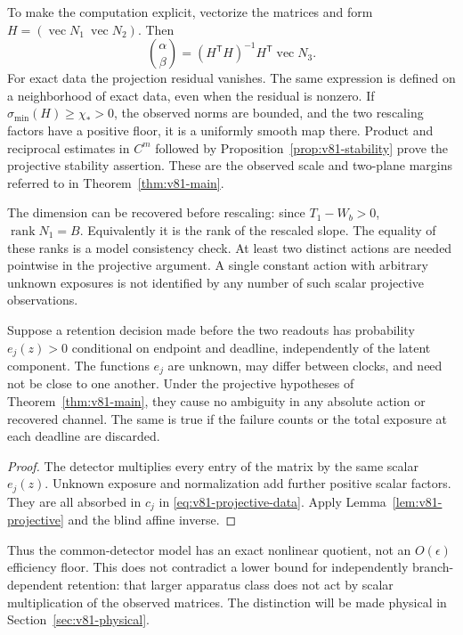 To make the computation explicit, vectorize the matrices and form
$H=(\operatorname{vec}N_1\ \operatorname{vec}N_2)$.  Then
\begin{equation}\label{eq:v81-alpha-beta}
 \binom\alpha\beta=(H^{\mathsf T}H)^{-1}
                             H^{\mathsf T}\operatorname{vec}N_3.
\end{equation}
For exact data the projection residual vanishes.  The same expression
is defined on a neighborhood of exact data, even when the residual is
nonzero.  If $\sigma_{\min}(H)\ge\chi_*>0$, the observed norms are
bounded, and the two rescaling factors have a positive floor, it is a
uniformly smooth map there.  Product and reciprocal estimates in $C^m$
followed by Proposition~\ref{prop:v81-stability} prove the projective
stability assertion.  These are the observed scale and two-plane margins
referred to in Theorem~\ref{thm:v81-main}.

The dimension can be recovered before rescaling: since $T_1-W_b>0$,
$\operatorname{rank}N_1=B$.  Equivalently it is the rank of the rescaled
slope.  The equality of these ranks is a model consistency check.  At
least two distinct actions are needed pointwise in the projective
argument.  A single constant action with arbitrary unknown exposures
is not identified by any number of such scalar projective observations.

\begin{corollary}
\label{cor:v81-detector}
Suppose a retention decision made before the two readouts has probability
$e_j(z)>0$ conditional on endpoint and deadline, independently of the
latent component.  The functions $e_j$ are unknown, may differ between
clocks, and need not be close to one another.  Under the projective
hypotheses of Theorem~\ref{thm:v81-main}, they cause no ambiguity in
any absolute action or recovered channel.  The same is true if the
failure counts or the total exposure at each deadline are discarded.
\end{corollary}
\begin{proof}
The detector multiplies every entry of the matrix by the same scalar
$e_j(z)$.  Unknown exposure and normalization add further positive scalar
factors.  They are all absorbed in $c_j$ in
\eqref{eq:v81-projective-data}.  Apply
Lemma~\ref{lem:v81-projective} and the blind affine inverse.
\end{proof}

Thus the common-detector model has an exact nonlinear quotient, not an
$O(\epsilon)$ efficiency floor.  This does not contradict a lower bound
for independently branch-dependent retention: that larger apparatus
class does not act by scalar multiplication of the observed matrices.
The distinction will be made physical in
Section~\ref{sec:v81-physical}.

